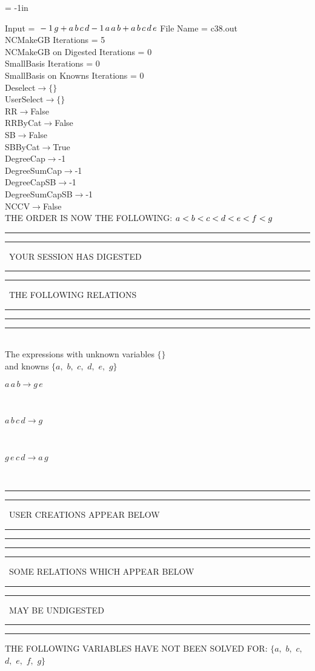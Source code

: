 \voffset = -1in
\evensidemargin 0.1in
\oddsidemargin 0.1in
\textheight 9in
\textwidth 6in

\normalsize
\baselineskip=12pt
\noindent
Input = 
$
\\-1\,
 g + a\,
 b\,
 c\,
 d\\
-1\,
 a\,
 a\,
 b + a\,
 b\,
 c\,
 d\,
 e\\
$
File Name = c38.out\\
NCMakeGB Iterations = 5\\
NCMakeGB on Digested Iterations = 0\\
SmallBasis Iterations = 0\\
SmallBasis on Knowns Iterations = 0\\
Deselect$\rightarrow \{\}$\\
UserSelect$\rightarrow \{\}$\\
RR$\rightarrow $False\\
RRByCat$\rightarrow $False\\
SB$\rightarrow $False\\
SBByCat$\rightarrow $True\\
DegreeCap$\rightarrow $-1\\
DegreeSumCap$\rightarrow $-1\\
DegreeCapSB$\rightarrow $-1\\
DegreeSumCapSB$\rightarrow $-1\\
NCCV$\rightarrow $False\\
THE ORDER IS NOW THE FOLLOWING:\hfil\break
$
a<b<c<d<e<f<g\\
$
\rule[2pt]{6in}{4pt}\hfil\break
\rule[2pt]{1.879in}{4pt}
\ YOUR SESSION HAS DIGESTED\ 
\rule[2pt]{1.879in}{4pt}\hfil\break
\rule[2pt]{1.923in}{4pt}
\ THE FOLLOWING RELATIONS\ 
\rule[2pt]{1.923in}{4pt}\hfil\break
\rule[2pt]{6in}{4pt}\hfil\break
\rule[3pt]{6in}{.7pt}\\
The expressions with unknown variables $\{\}$\\
and knowns $\{a,
$ $
b,
$ $
c,
$ $
d,
$ $
e,
$ $
g\}$\smallskip\\
\begin{minipage}{6in}
$
a\,
 a\,
 b\rightarrow g\,
 e
$
\end{minipage}\medskip \\
\begin{minipage}{6in}
$
a\,
 b\,
 c\,
 d\rightarrow g
$
\end{minipage}\medskip \\
\begin{minipage}{6in}
$
g\,
 e\,
 c\,
 d\rightarrow a\,
 g
$
\end{minipage}\\
\rule[2pt]{6in}{1pt}\hfil\break
\rule[2.5pt]{1.701in}{1pt}
\ USER CREATIONS APPEAR BELOW\ 
\rule[2.5pt]{1.701in}{1pt}\hfil\break
\rule[2pt]{6in}{1pt}\hfil\break
\rule[2pt]{6in}{4pt}\hfil\break
\rule[2pt]{1.45in}{4pt}
\ SOME RELATIONS WHICH APPEAR BELOW\ 
\rule[2pt]{1.45in}{4pt}\hfil\break
\rule[2pt]{2.18in}{4pt}
\ MAY BE UNDIGESTED\ 
\rule[2pt]{2.18in}{4pt}\hfil\break
\rule[2pt]{6in}{4pt}\hfil\break
THE FOLLOWING VARIABLES HAVE NOT BEEN SOLVED FOR:\hfil\break
$\{a,
$ $
b,
$ $
c,
$ $
d,
$ $
e,
$ $
f,
$ $
g\}$
\smallskip\\
\vspace{10pt}

